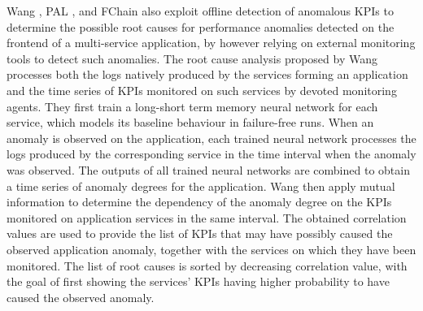 Wang \etal \cite{20_Wang2020_RootCauseMetricLocation}, PAL \cite{42_Nguyen2011_PAL}, and FChain \cite{43_Nguyen2013_FChain} also exploit offline detection of anomalous KPIs to determine the possible root causes for performance anomalies detected on the frontend of a multi-service application, by however relying on external monitoring tools to detect such anomalies.
The root cause analysis proposed by Wang \etal \cite{20_Wang2020_RootCauseMetricLocation} processes both the logs natively produced by the services forming an application and the time series of KPIs monitored on such services by devoted monitoring agents.
They first train a long-short term memory neural network for each service, which models its baseline behaviour in failure-free runs.
When an anomaly is observed on the application, each trained neural network processes the logs produced by the corresponding service in the time interval when the anomaly was observed.
The outputs of all trained neural networks are combined to obtain a time series of anomaly degrees for the application.
Wang \etal \cite{20_Wang2020_RootCauseMetricLocation} then apply mutual information \cite{Peng2005_MutualInformation} to determine the dependency of the anomaly degree on the KPIs monitored on application services in the same interval. 
The obtained correlation values are used to provide the list of KPIs that may have possibly caused the observed application anomaly, together with the services on which they have been monitored. 
The list of root causes is sorted by decreasing correlation value, with the goal of first showing the services' KPIs having higher probability to have caused the observed anomaly.

